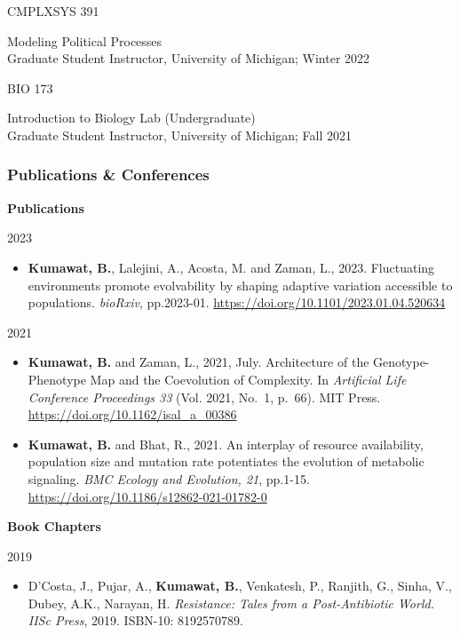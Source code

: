 \documentclass[
  letterpaper,
  DIV=11,
  numbers=noendperiod]{scrartcl}
\providecommand{\tightlist}{%
  \setlength{\itemsep}{0pt}\setlength{\parskip}{0pt}}\usepackage{longtable,booktabs,array}
\begin{document}
CMPLXSYS 391

Modeling Political Processes\\
Graduate Student Instructor, University of Michigan; Winter 2022

BIO 173

Introduction to Biology Lab (Undergraduate)\\
Graduate Student Instructor, University of Michigan; Fall 2021

\subsubsection{Publications \&
Conferences}\label{publications-conferences}

\textbf{Publications}

2023

\begin{itemize}
\tightlist
\item
  \textbf{Kumawat, B.}, Lalejini, A., Acosta, M. and Zaman, L., 2023.
  Fluctuating environments promote evolvability by shaping adaptive
  variation accessible to populations. \emph{bioRxiv}, pp.2023-01.
  \url{https://doi.org/10.1101/2023.01.04.520634}
\end{itemize}

2021

\begin{itemize}
\item
  \textbf{Kumawat, B.} and Zaman, L., 2021, July. Architecture of the
  Genotype-Phenotype Map and the Coevolution of Complexity. In
  \emph{Artificial Life Conference Proceedings 33} (Vol. 2021, No.~1,
  p.~66). MIT Press. \url{https://doi.org/10.1162/isal_a_00386}\\
\item
  \textbf{Kumawat, B.} and Bhat, R., 2021. An interplay of resource
  availability, population size and mutation rate potentiates the
  evolution of metabolic signaling. \emph{BMC Ecology and Evolution,
  21}, pp.1-15. \url{https://doi.org/10.1186/s12862-021-01782-0}
\end{itemize}

\textbf{Book Chapters}

2019

\begin{itemize}
\tightlist
\item
  D'Costa, J., Pujar, A., \textbf{Kumawat, B.}, Venkatesh, P., Ranjith,
  G., Sinha, V., Dubey, A.K., Narayan, H. \emph{Resistance: Tales from a
  Post-Antibiotic World. IISc Press}, 2019. ISBN-10: 8192570789.
\end{itemize}
\end{document}
